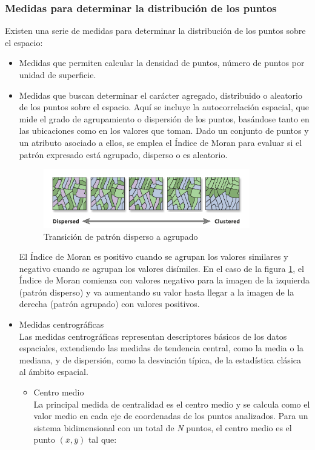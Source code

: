 \subsubsection{Medidas para determinar la distribución de los puntos}
Existen una serie de medidas para determinar la distribución de los puntos sobre el espacio:
\begin{itemize}
    \item Medidas que permiten calcular la densidad de puntos, número de puntos por unidad de superficie.
    \item Medidas que buscan determinar el carácter agregado, distribuido o aleatorio de los puntos sobre el espacio.
    Aquí se incluye la autocorrelación espacial, que mide el grado de agrupamiento o dispersión de los puntos, basándose tanto en las ubicaciones como en los valores que toman.
    Dado un conjunto de puntos y un atributo asociado a ellos, se emplea el Índice de Moran para evaluar si el patrón expresado está agrupado, disperso o es aleatorio. 
    \begin{figure}[H]
        \centering
        \includegraphics[width=0.85\textwidth, height=0.15\textheight]{Imagenes/analisis/moran.png}
        \caption{Transición de patrón disperso a agrupado} \label{fig:disperso_agrupado}
    \end{figure}
    El Índice de Moran es positivo cuando se agrupan los valores similares y negativo cuando se agrupan los valores disímiles. 
    En el caso de la figura \ref{fig:disperso_agrupado}, el Índice de Moran comienza con valores negativo para la imagen de la izquierda (patrón disperso) 
    y va aumentando su valor hasta llegar a la imagen de la derecha (patrón agrupado) con valores positivos. 
    \item Medidas centrográficas \\
    Las medidas centrográficas representan descriptores básicos de los datos espaciales, extendiendo las medidas de tendencia central,
    como la media o la mediana, y de dispersión, como la desviación típica, de la estadística clásica al ámbito espacial.

    \begin{itemize}
        \item Centro medio \\
        La principal medida de centralidad es el centro medio y se calcula como el valor medio en cada eje de coordenadas de los puntos analizados.
        Para un sistema bidimensional con un total de \textit{N} puntos, el centro medio es el punto $(\overline{x}, \overline{y})$ tal que:


\end{itemize}
\end{itemize}
